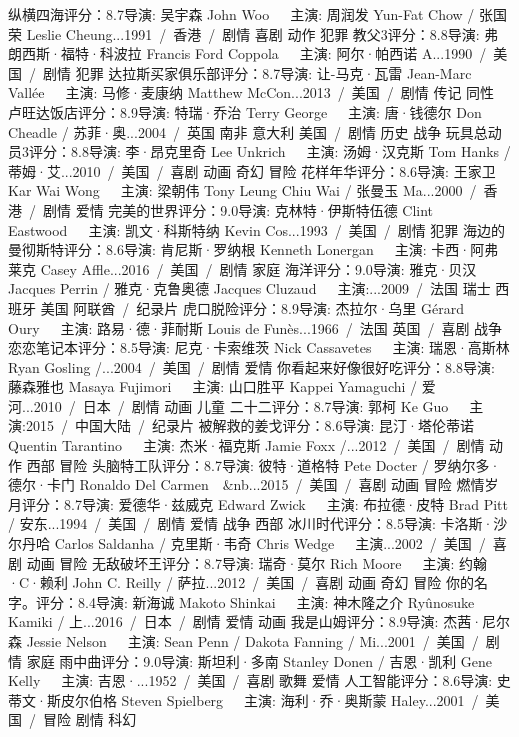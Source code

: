 纵横四海评分：8.7导演: 吴宇森 John Woo   主演: 周润发 Yun-Fat Chow / 张国荣 Leslie Cheung...1991 / 香港 / 剧情 喜剧 动作 犯罪
教父3评分：8.8导演: 弗朗西斯·福特·科波拉 Francis Ford Coppola   主演: 阿尔·帕西诺 A...1990 / 美国 / 剧情 犯罪
达拉斯买家俱乐部评分：8.7导演: 让-马克·瓦雷 Jean-Marc Vallée   主演: 马修·麦康纳 Matthew McCon...2013 / 美国 / 剧情 传记 同性
卢旺达饭店评分：8.9导演: 特瑞·乔治 Terry George   主演: 唐·钱德尔 Don Cheadle / 苏菲·奥...2004 / 英国 南非 意大利 美国 / 剧情 历史 战争
玩具总动员3评分：8.8导演: 李·昂克里奇 Lee Unkrich   主演: 汤姆·汉克斯 Tom Hanks / 蒂姆·艾...2010 / 美国 / 喜剧 动画 奇幻 冒险
花样年华评分：8.6导演: 王家卫 Kar Wai Wong   主演: 梁朝伟 Tony Leung Chiu Wai / 张曼玉 Ma...2000 / 香港 / 剧情 爱情
完美的世界评分：9.0导演: 克林特·伊斯特伍德 Clint Eastwood   主演: 凯文·科斯特纳 Kevin Cos...1993 / 美国 / 剧情 犯罪
海边的曼彻斯特评分：8.6导演: 肯尼斯·罗纳根 Kenneth Lonergan   主演: 卡西·阿弗莱克 Casey Affle...2016 / 美国 / 剧情 家庭
海洋评分：9.0导演: 雅克·贝汉 Jacques Perrin / 雅克·克鲁奥德 Jacques Cluzaud   主演:...2009 / 法国 瑞士 西班牙 美国 阿联酋 / 纪录片
虎口脱险评分：8.9导演: 杰拉尔·乌里 Gérard Oury   主演: 路易·德·菲耐斯 Louis de Funès...1966 / 法国 英国 / 喜剧 战争
恋恋笔记本评分：8.5导演: 尼克·卡索维茨 Nick Cassavetes   主演: 瑞恩·高斯林 Ryan Gosling /...2004 / 美国 / 剧情 爱情
你看起来好像很好吃评分：8.8导演: 藤森雅也 Masaya Fujimori   主演: 山口胜平 Kappei Yamaguchi / 爱河...2010 / 日本 / 剧情 动画 儿童
二十二评分：8.7导演: 郭柯 Ke Guo   主演:2015 / 中国大陆 / 纪录片
被解救的姜戈评分：8.6导演: 昆汀·塔伦蒂诺 Quentin Tarantino   主演: 杰米·福克斯 Jamie Foxx /...2012 / 美国 / 剧情 动作 西部 冒险
头脑特工队评分：8.7导演: 彼特·道格特 Pete Docter / 罗纳尔多·德尔·卡门 Ronaldo Del Carmen  &nb...2015 / 美国 / 喜剧 动画 冒险
燃情岁月评分：8.7导演: 爱德华·兹威克 Edward Zwick   主演: 布拉德·皮特 Brad Pitt / 安东...1994 / 美国 / 剧情 爱情 战争 西部
冰川时代评分：8.5导演: 卡洛斯·沙尔丹哈 Carlos Saldanha / 克里斯·韦奇 Chris Wedge   主演...2002 / 美国 / 喜剧 动画 冒险
无敌破坏王评分：8.7导演: 瑞奇·莫尔 Rich Moore   主演: 约翰·C·赖利 John C. Reilly / 萨拉...2012 / 美国 / 喜剧 动画 奇幻 冒险
你的名字。评分：8.4导演: 新海诚 Makoto Shinkai   主演: 神木隆之介 Ryûnosuke Kamiki / 上...2016 / 日本 / 剧情 爱情 动画
我是山姆评分：8.9导演: 杰茜·尼尔森 Jessie Nelson   主演: Sean Penn / Dakota Fanning / Mi...2001 / 美国 / 剧情 家庭
雨中曲评分：9.0导演: 斯坦利·多南 Stanley Donen / 吉恩·凯利 Gene Kelly   主演: 吉恩·...1952 / 美国 / 喜剧 歌舞 爱情
人工智能评分：8.6导演: 史蒂文·斯皮尔伯格 Steven Spielberg   主演: 海利·乔·奥斯蒙 Haley...2001 / 美国 / 冒险 剧情 科幻
